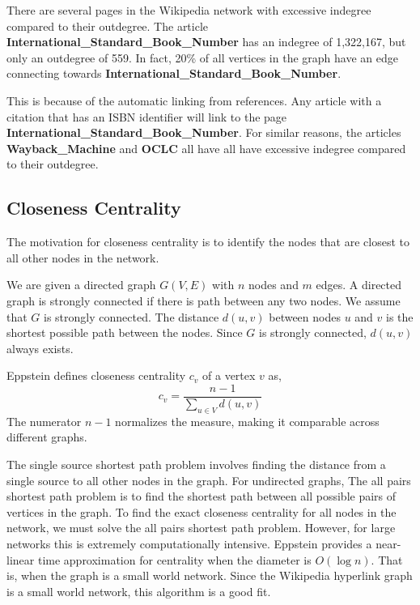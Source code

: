 \documentclass{article}
\begin{document}
There are several pages in the Wikipedia network with excessive indegree compared to their outdegree. 
The article \textbf{International\_Standard\_Book\_Number} has an indegree of 1,322,167, but only an outdegree of 559. In fact, 20\% of all vertices in the graph have an edge connecting towards \textbf{International\_Standard\_Book\_Number}.

This is because of the automatic linking from references.
Any article with a citation that has an ISBN identifier will link to the page \textbf{International\_Standard\_Book\_Number}.
For similar reasons, the articles \textbf{Wayback\_Machine} and \textbf{OCLC} all have all have excessive indegree compared to their outdegree.

\subsection{Closeness Centrality}

The motivation for closeness centrality is to identify the nodes that are closest to all other nodes in the network.

We are given a directed graph $G(V,E)$ with $n$ nodes and $m$ edges.
A directed graph is strongly connected if there is path between any two nodes. We assume that $G$ is strongly connected.
The distance $d(u, v)$ between nodes $u$ and $v$ is the shortest possible path between the nodes.
Since $G$ is strongly connected, $d(u, v)$ always exists.


Eppstein defines closeness centrality $c_v$ of a vertex $v$ as,
\begin{equation*}
    c_v = \frac{n-1}{\sum_{u \in V}d(u,v)}
\end{equation*} 
The numerator $n-1$ normalizes the measure, making it comparable across different graphs.


The single source shortest path problem involves finding the distance from a single source to all other nodes in the graph. For undirected graphs, 
The all pairs shortest path problem is to find the shortest path between all possible pairs of vertices in the graph.
To find the exact closeness centrality for all nodes in the network, we must solve the all pairs shortest path problem. However, for large networks this is extremely computationally intensive. 
Eppstein provides a near-linear time approximation for centrality when the diameter is $O(\log n)$. That is, when the graph is a small world network. Since the Wikipedia hyperlink graph is a small world network, this algorithm is a good fit.
\end{document}
